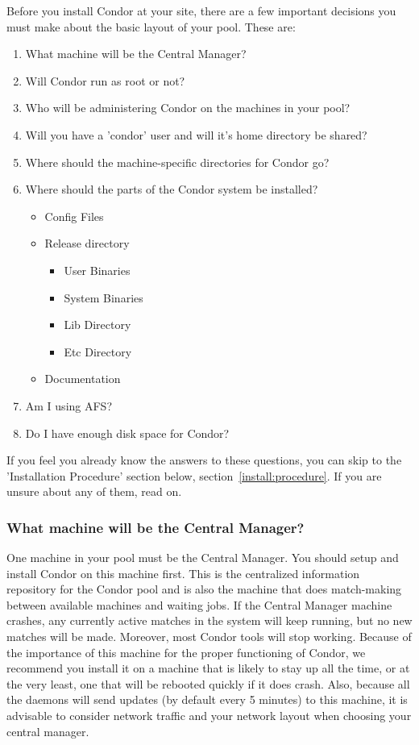 Before you install Condor at your site, there are a few important
decisions you must make about the basic layout of your pool.  These
are:

\begin{enumerate}
\item What machine will be the Central Manager?
\item Will Condor run as root or not?
\item Who will be administering Condor on the machines in your pool?
\item Will you have a 'condor' user and will it's home directory be
   shared? 
\item Where should the machine-specific directories for Condor go?
\item Where should the parts of the Condor system be installed? 
	\begin{itemize}
	\item Config Files
	\item Release directory
		\begin{itemize}
		\item User Binaries
		\item System Binaries 
		\item Lib Directory
	  	\item Etc Directory
		\end{itemize}
	\item Documentation
	\end{itemize}
\item Am I using AFS?
\item Do I have enough disk space for Condor?
\end{enumerate}

If you feel you already know the answers to these questions, you can
skip to the 'Installation Procedure' section below, section~\ref{install:procedure}.
If you are unsure about any of them, read on.

\subsubsection{What machine will be the Central Manager?}

One machine in your pool must be the Central Manager.  You should
setup and install Condor on this machine first.  This is the
centralized information repository for the Condor pool and is also the
machine that does match-making between available machines and waiting
jobs.  If the Central Manager machine crashes, any currently active
matches in the system will keep running, but no new matches will be
made.  Moreover, most Condor tools will stop working.  Because of the
importance of this machine for the proper functioning of Condor, we
recommend you install it on a machine that is likely to stay up all the
time, or at the very least, one that will be rebooted quickly if it
does crash.  Also, because all the daemons will send updates (by
default every 5 minutes) to this machine, it is advisable to consider
network traffic and your network layout when choosing your central
manager.

